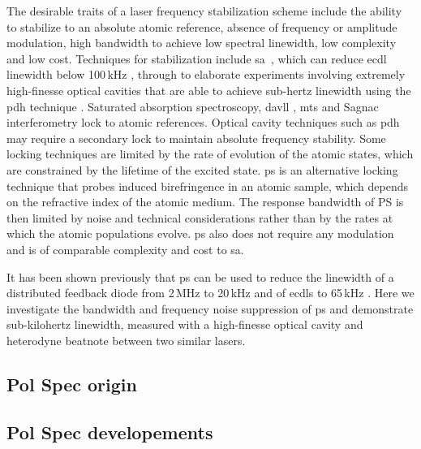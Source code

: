 The desirable traits of a laser frequency stabilization scheme include the ability to stabilize to an absolute atomic reference, absence of frequency or amplitude modulation, high bandwidth to achieve low spectral linewidth, low complexity and low cost. Techniques for stabilization include \gls*{sa}~\cite{maguire_theoretical_2006, haroche_theory_1972, preston_doppler-free_1996}, which can reduce \gls*{ecdl} linewidth below 100\,kHz \cite{cuneo_optically_1994, saliba_linewidths_2009}, through to elaborate experiments involving extremely high-finesse optical cavities that are able to achieve sub-hertz linewidth using the \gls*{pdh} technique \cite{ludlow_compact_2007}.  Saturated absorption spectroscopy, \gls*{davll} \cite{corwin_frequency-stabilized_1998,millett-sikking_davll_2007}, \gls*{mts} \cite{shirley_modulation_1982, mccarron_modulation_2008,xiang-hui_ultra-stable_2009} and Sagnac interferometry \cite{robins_Interferometric_2002,jundt_non-linear_2003} lock to atomic references. Optical cavity techniques such as \gls*{pdh} \cite{drever_laser_1983} may require a secondary lock to maintain absolute frequency stability. Some locking techniques are limited by the rate of evolution of the atomic states, which are constrained by the lifetime of the excited state.
\Gls*{ps} \cite{wieman_doppler-free_1976, demtroder_laser_2003} is an alternative locking technique that probes induced birefringence in an atomic sample, which depends on the refractive index of the atomic medium.  The response bandwidth of PS is then limited by noise and technical considerations rather than by the rates at which the atomic populations evolve. \Gls*{ps} also does not require any modulation and is of comparable complexity and cost to \gls*{sa}.

It has been shown previously that \gls*{ps} can be used to reduce the linewidth of a distributed feedback diode from 2\,MHz to 20\,kHz \cite{torii_laser-phase_2012} and of \glspl*{ecdl} to 65\,kHz \cite{yoshikawa_frequency_2003}. Here we investigate the bandwidth and frequency noise suppression of \gls*{ps} and demonstrate sub-kilohertz linewidth, measured with a high-finesse optical cavity and heterodyne beatnote between two similar lasers.

\subsection{Pol Spec origin}
\subsection{Pol Spec developements}
